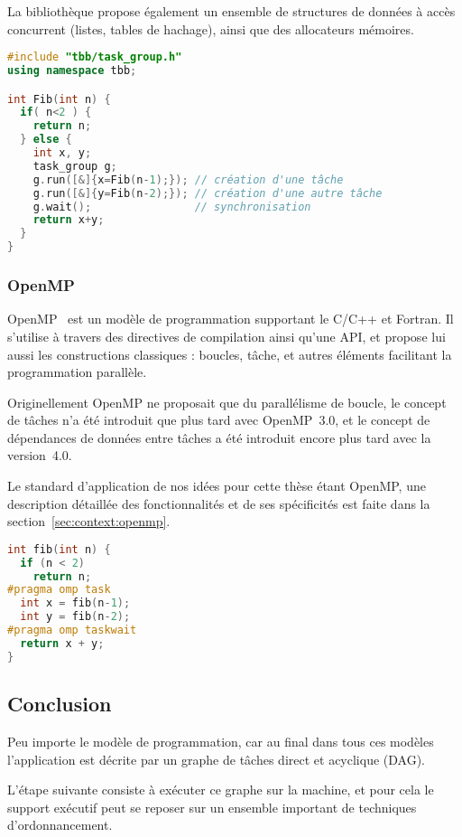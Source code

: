 La bibliothèque propose également un ensemble de structures de données à accès concurrent (listes, tables de hachage), ainsi que des allocateurs mémoires.

\begin{lstlisting}[language=c++,caption=Fibonacci exprimé en TBB,label=lst:context:tbb,basicstyle=\small]
#include "tbb/task_group.h"
using namespace tbb;

int Fib(int n) {
  if( n<2 ) {
    return n;
  } else {
    int x, y;
    task_group g;
    g.run([&]{x=Fib(n-1);}); // création d'une tâche
    g.run([&]{y=Fib(n-2);}); // création d'une autre tâche
    g.wait();                // synchronisation
    return x+y;
  }
}
\end{lstlisting}

\subsubsection{OpenMP}

OpenMP~\cite{openmp45} est un modèle de programmation supportant le C/C++ et Fortran.
Il s'utilise à travers des directives de compilation ainsi qu'une API, et propose lui aussi les constructions classiques : boucles, tâche, et autres éléments facilitant la programmation parallèle.

Originellement OpenMP ne proposait que du parallélisme de boucle, le concept de tâches n'a été introduit que plus tard avec OpenMP~3.0, et le concept de dépendances de données entre tâches a été introduit encore plus tard avec la version~4.0.

Le standard d'application de nos idées pour cette thèse étant OpenMP, une description détaillée des fonctionnalités et de ses spécificités est faite dans la section~\ref{sec:context:openmp}.

\begin{lstlisting}[language=c++,caption=Fibonacci exprimé en OpenMP,label=lst:context:openmp,basicstyle=\small]
int fib(int n) {
  if (n < 2)
    return n;
#pragma omp task
  int x = fib(n-1);
  int y = fib(n-2);
#pragma omp taskwait
  return x + y;
}
\end{lstlisting}

\subsection*{Conclusion}

Peu importe le modèle de programmation, car au final dans tous ces modèles l'application est décrite par un graphe de tâches direct et acyclique (DAG).

L'étape suivante consiste à exécuter ce graphe sur la machine, et pour cela le support exécutif peut se reposer sur un ensemble important de techniques d'ordonnancement. 


